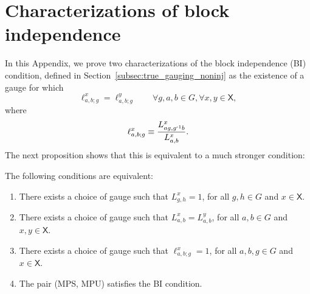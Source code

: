 \documentclass[reprint,
superscriptaddress,
amsmath,amssymb,
notitlepage,
aps,
prb,
10pt, 
tightenlines
]{revtex4-2}
\begin{document}
\section{Characterizations of block independence}
\label{app:block_indep}
In this Appendix, we prove two characterizations of the block independence (BI) condition, defined in Section~\ref{subsec:true_gauging_noninj} as the existence of a gauge for which
\begin{equation}
    \ell_{a,b;g}^x = \ell_{a,b;g}^y\qquad \forall g, a, b\in G, \forall x,y\in \mathsf{X},
\end{equation}
where 
\begin{equation}
    \ell_{a,b;g}^x \equiv\dfrac{L^x_{ag,g^{\text{-}1}b}}{L^x_{a,b}}.
\end{equation}
The next proposition shows that this is equivalent to a much stronger condition:
\begin{proposition}
\label{prop:technical01}
    The following conditions are equivalent: \begin{enumerate}
        \item There exists a choice of gauge such that $L^x_{g,h}=1$, for all $g,h\in G$ and $x\in\mathsf{X}$.

        \item There exists a choice of gauge such that $L_{a,b}^x = L_{a,b}^y$, for all $a,b\in G$ and $x,y\in \mathsf{X}$. 
          
        \item There exists a choice of gauge such that $\ell_{a,b;g}^x=1$, for all $a,b,g\in G$ and $x\in \mathsf{X}$.
        
        \item The pair (MPS, MPU) satisfies the BI condition.
    \end{enumerate}
\end{proposition}
\end{document}
